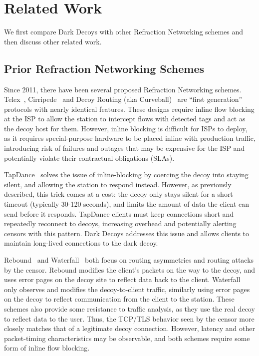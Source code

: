 \section{Related Work}

We first compare Dark Decoys with other Refraction Networking schemes and then discuss other related work.

\subsection{Prior Refraction Networking Schemes}

Since 2011, there have been several proposed Refraction Networking schemes.
Telex~\cite{telex11}, Cirripede~\cite{cirripede11} and Decoy
Routing (aka Curveball)~\cite{curveball11} are ``first generation'' protocols with nearly
identical features. These designs require inline flow blocking at the ISP to
allow the station to intercept flows with detected tags and act as the decoy
host for them. However, inline blocking is difficult for ISPs to deploy, as it
requires special-purpose hardware to be placed inline with production traffic,
introducing risk of failures and outages that may be expensive for the ISP
and potentially violate their contractual obligations (SLAs).

TapDance~\cite{tapdance14} solves the issue of inline-blocking by coercing the
decoy into staying silent, and allowing the station to respond instead. However,
as previously described, this trick comes at a cost: the decoy only stays silent
for a short timeout (typically 30-120 seconds), and limits the amount of data
the client can send before it responds. TapDance clients must keep connections
short and repeatedly reconnect to decoys, increasing overhead and potentially
alerting censors with this pattern. Dark Decoys addresses this issue and allows
clients to maintain long-lived connections to the dark decoy.

Rebound~\cite{rebound15} and Waterfall~\cite{waterfall17} both focus on routing
asymmetries and routing attacks by the censor. Rebound modifies the client's
packets on the way to the decoy, and uses error pages on the decoy site to
reflect data back to the client. Waterfall only observes and modifies the
decoy-to-client traffic, similarly using error pages on the decoy to reflect
communication from the client to the station. These schemes also provide some
resistance to traffic analysis, as they use the real decoy to reflect data to
the user. Thus, the TCP/TLS behavior seen by the censor more closely matches
that of a legitimate decoy connection. However, latency and other packet-timing
characteristics may be observable, and both schemes require some form of inline
flow blocking.

